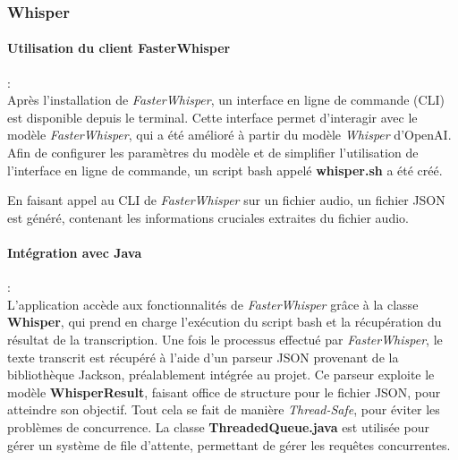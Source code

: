\subsubsection{Whisper}
\label{sec:whisperImpl}

\paragraph*{Utilisation du client FasterWhisper} : \\ Après l'installation de
\textit{FasterWhisper}, un interface en ligne de commande (CLI) est disponible
depuis le terminal. Cette interface permet d'interagir avec le modèle
\textit{FasterWhisper}, qui a été amélioré à partir du modèle \textit{Whisper}
d'OpenAI. Afin de configurer les paramètres du modèle et de simplifier
l'utilisation de l'interface en ligne de commande, un script bash appelé
\textbf{whisper.sh} a été créé.

En faisant appel au CLI de \textit{FasterWhisper} sur un fichier audio, un
fichier JSON est généré, contenant les informations cruciales extraites du
fichier audio.

\paragraph*{Intégration avec Java}: \\ L'application accède aux fonctionnalités de
\textit{FasterWhisper} grâce à la classe \textbf{Whisper}, qui prend en
charge l'exécution du script bash et la récupération du résultat de la
transcription. Une fois le processus effectué par \textit{FasterWhisper}, le
texte transcrit est récupéré à l'aide d'un parseur JSON provenant de la
bibliothèque Jackson, préalablement intégrée au projet. Ce parseur exploite le
modèle \textbf{WhisperResult}, faisant office de structure pour le fichier
JSON, pour atteindre son objectif. Tout cela se fait de manière
\textit{Thread-Safe}, pour éviter les problèmes de concurrence. La classe
\textbf{ThreadedQueue.java} est utilisée pour gérer un système de file
d'attente, permettant de gérer les requêtes concurrentes.